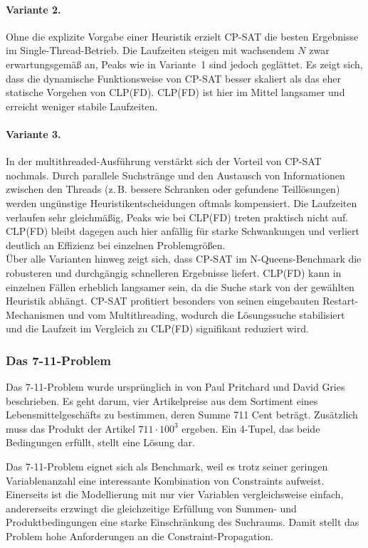 \documentclass[12pt,a4paper]{article}
\begin{document}
\paragraph{Variante 2.}
Ohne die explizite Vorgabe einer Heuristik erzielt CP-SAT die besten Ergebnisse im Single-Thread-Betrieb. 
Die Laufzeiten steigen mit wachsendem $N$ zwar erwartungsgemäß an, Peaks wie in Variante~1 sind jedoch geglättet. 
Es zeigt sich, dass die dynamische Funktionsweise von CP-SAT besser skaliert als das eher statische Vorgehen von CLP(FD).
CLP(FD) ist hier im Mittel langsamer und erreicht weniger stabile Laufzeiten.
\paragraph{Variante 3.}
In der multithreaded-Ausführung verstärkt sich der Vorteil von CP-SAT nochmals. 
Durch parallele Suchstränge und den Austausch von Informationen zwischen den Threads (z.\,B. bessere Schranken oder gefundene Teillösungen) werden ungünstige Heuristikentscheidungen oftmals kompensiert. 
Die Laufzeiten verlaufen sehr gleichmäßig, Peaks wie bei CLP(FD) treten praktisch nicht auf. 
CLP(FD) bleibt dagegen auch hier anfällig für starke Schwankungen und verliert deutlich an Effizienz bei einzelnen Problemgrößen. 
\\

\noindent
Über alle Varianten hinweg zeigt sich, dass CP-SAT im N-Queens-Benchmark die robusteren und durchgängig schnelleren Ergebnisse liefert. 
CLP(FD) kann in einzelnen Fällen erheblich langsamer sein, da die Suche stark von der gewählten Heuristik abhängt. 
CP-SAT profitiert besonders von seinen eingebauten Restart-Mechanismen und vom Multithreading, wodurch die Lösungssuche stabilisiert und die Laufzeit im Vergleich zu CLP(FD) signifikant reduziert wird.
\subsubsection{Das 7-11-Problem}
Das 7-11-Problem wurde ursprünglich in \cite{seven_eleven} von Paul Pritchard und David Gries beschrieben.
Es geht darum, vier Artikelpreise aus dem Sortiment eines Lebensmittelgeschäfts zu bestimmen, deren Summe 711 Cent beträgt.
Zusätzlich muss das Produkt der Artikel $711 \cdot 100^3$ ergeben.
Ein 4-Tupel, das beide Bedingungen erfüllt, stellt eine Lösung dar. 

Das 7-11-Problem eignet sich als Benchmark, weil es trotz seiner geringen Variablenanzahl eine interessante Kombination von Constraints aufweist.
Einerseits ist die Modellierung mit nur vier Variablen vergleichsweise einfach, andererseits erzwingt die gleichzeitige Erfüllung von Summen- und Produktbedingungen eine starke Einschränkung des Suchraums.
Damit stellt das Problem hohe Anforderungen an die Constraint-Propagation.
\end{document}
